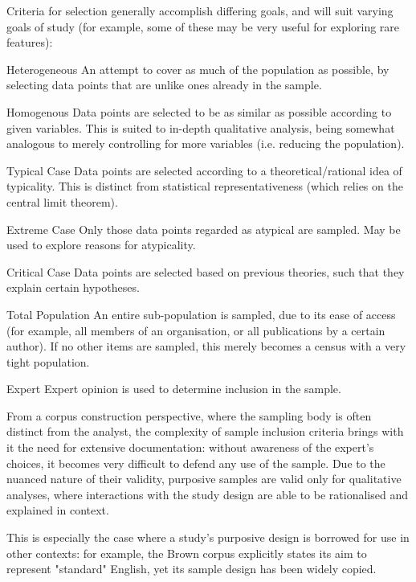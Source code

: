 Criteria for selection generally accomplish differing goals, and will suit varying goals of study\cite{advice2000study} (for example, some of these may be very useful for exploring rare features):

\begin{itemizeTitle}
    \item[Heterogeneous] An attempt to cover as much of the population as possible, by selecting data points that are unlike ones already in the sample.
    \item[Homogenous] Data points are selected to be as similar as possible according to given variables.  This is suited to in-depth qualitative analysis, being somewhat analogous to merely controlling for more variables (i.e. reducing the population).
    \item[Typical Case] Data points are selected according to a theoretical/rational idea of typicality.  This is distinct from statistical representativeness (which relies on the central limit theorem).
    \item[Extreme Case] Only those data points regarded as atypical are sampled.  May be used to explore reasons for atypicality.
    \item[Critical Case] Data points are selected based on previous theories, such that they explain certain hypotheses.
    \item[Total Population] An entire sub-population is sampled, due to its ease of access (for example, all members of an organisation, or all publications by a certain author).  If no other items are sampled, this merely becomes a census with a very tight population.
    \item[Expert] Expert opinion is used to determine inclusion in the sample.
\end{itemizeTitle}

From a corpus construction perspective, where the sampling body is often distinct from the analyst, the complexity of sample inclusion criteria brings with it the need for extensive documentation: without awareness of the expert's choices, it becomes very difficult to defend any use of the sample.  Due to the nuanced nature of their validity, purposive samples are valid only for qualitative analyses, where interactions with the study design are able to be rationalised and explained in context.

This is especially the case where a study's purposive design is borrowed for use in other contexts: for example, the Brown corpus explicitly states its aim to represent "standard" English, yet its sample design has been widely copied\cite{hundt1999manual,shastri1988kolhapur,mcenery2004lancaster}.


